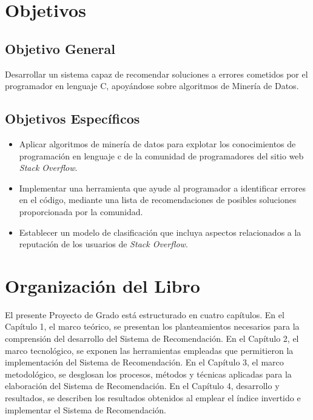 \section*{Objetivos}

\subsection*{Objetivo General}


Desarrollar un sistema capaz de recomendar soluciones a errores cometidos por el programador en lenguaje C,
apoyándose sobre algoritmos de Minería de Datos.

\subsection*{Objetivos Específicos}
\begin{itemize}
  \item Aplicar algoritmos de minería de datos para explotar los conocimientos
  de programación en lenguaje c de la comunidad de programadores del sitio web \textit{Stack Overflow}.
  
  \item Implementar una herramienta que ayude al programador a identificar errores en el código,
  mediante una lista de recomendaciones de posibles soluciones proporcionada por la comunidad.

  \item Establecer un modelo de clasificación que incluya aspectos relacionados
  a la reputación de los usuarios de \textit{Stack Overflow}.
\end{itemize}

\section*{Organización del Libro}
El presente Proyecto de Grado está estructurado en cuatro capítulos.
En el Capítulo 1, el marco teórico,
se presentan los planteamientos necesarios para la comprensión del desarrollo del Sistema de Recomendación.
En el Capítulo 2, el marco tecnológico,
se exponen las herramientas empleadas que permitieron la implementación del Sistema de Recomendación.
En el Capítulo 3, el marco metodológico,
se desglosan los procesos, métodos y técnicas aplicadas para la elaboración del Sistema de Recomendación.
En el Capítulo 4, desarrollo y resultados,
se describen los resultados obtenidos al emplear el índice invertido e implementar el Sistema de Recomendación.
